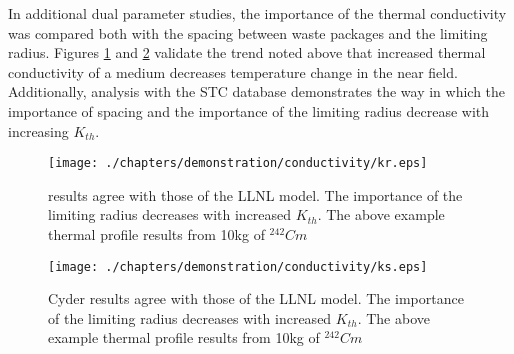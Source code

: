 In additional dual parameter studies, the importance of the thermal conductivity 
was compared both with the spacing between waste packages and the limiting 
radius. Figures \ref{fig:kr} and \ref{fig:ks} validate the trend noted above 
that increased thermal conductivity of a medium decreases temperature change in 
the near field.  Additionally, analysis with the \Cyder STC database 
demonstrates the way in which the importance of spacing and the importance of 
the limiting radius decrease with increasing $K_{th}$.

\begin{figure}[htbp!]
\begin{center}
\texttt{[image: ./chapters/demonstration/conductivity/kr.eps]}
\end{center}
\caption[$K_{th}$ vs. $r_{lim}$ Sensitivity in Cyder]{\Cyder results agree with 
those of the LLNL model. The importance of the limiting radius decreases with 
increased $K_{th}$. The above example thermal profile results from 10kg of 
$^{242}Cm$}
\label{fig:kr}
\end{figure}

\begin{figure}[htbp!]
\begin{center}
\texttt{[image: ./chapters/demonstration/conductivity/ks.eps]}
\end{center}
\caption[$K_{th}$ vs. Waste Package Spacing Sensitivity in Cyder]{Cyder results agree with 
those of the LLNL model. The importance of the limiting radius decreases with 
increased $K_{th}$. The above example thermal profile results from 10kg of 
$^{242}Cm$}
\label{fig:ks}
\end{figure}

